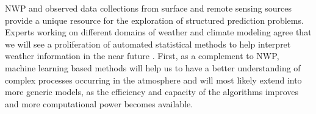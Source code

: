 \medskip

NWP and observed data collections from surface and remote sensing sources provide a unique resource for the exploration of structured prediction problems. Experts working on different domains of weather and climate modeling agree that we will see a proliferation of automated statistical methods to help interpret weather information in the near future \citep{jones2017ml}. First, as a complement to NWP, machine learning based methods will help us to have a better understanding of complex processes occurring in the atmosphere and will most likely extend into more generic models, as the efficiency and capacity of the algorithms improves and more computational power becomes available.

\medskip


